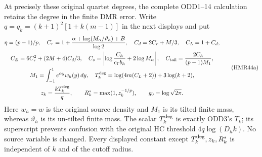 \documentclass[11pt,a4paper]{article}
\begin{document}
At precisely these original quartet degrees, the complete
ODD1--14 calculation retains the degree in the finite DMR error.
Write $q=q_k=(k+1)^2[1+k(m-1)]$ in the next displays and put
\[
\begin{gathered}
 \eta=(p-1)/p,\quad
 C_r=1+\frac{\alpha+\log(M_\alpha/\vartheta_h)+B}{\log2},\quad
 C_d=2C_r+M/3,\quad C_L=1+C_d,\\
 C_E=6C_r^2+(2M+4)C_d/3,\quad
 C_s=\left|\log\frac{C_h}{c_\Gamma b_h}+2\log M_\alpha\right|,
 \quad C_{\rm tail}=\frac{2C_h}{(p-1)M_1},\\
 M_1=\int_{-1}^1e^{\alpha y}w_h(y)\,dy,\quad
 T_k^{\rm deg}=\log(4m(C_L+2))+3\log(k+2),\\
 z_k=\frac{kT_k^{\rm deg}}q,\qquad
 R_k^*=\max(1,z_k^{-1/p}),\qquad
 g_0=\log\sqrt{2\pi}.
\end{gathered}\tag{HMR44a}
\]
Here $w_h=w$ is the original source density and $M_1$ is its
tilted finite mass, whereas $\vartheta_h$ is its un-tilted
finite mass. The scalar $T_k^{\rm deg}$ is exactly ODD3's
$T_k$; its superscript prevents confusion with the original
HC threshold $4q\log(D_hk)$. No source variable is changed.
Every displayed constant except $T_k^{\rm deg},z_k,R_k^*$
is independent of $k$ and of the cutoff radius.
\end{document}
